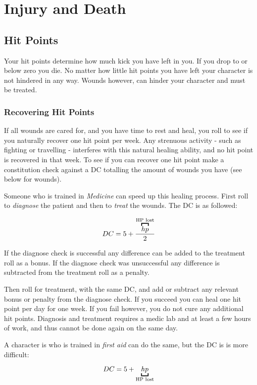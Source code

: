 \chapter{Injury and Death}

\section{Hit Points}
\label{sec:hp}

Your hit points determine how much kick you have left in you. If you drop to or
below zero you die. No matter how little hit points you have left your character
is not hindered in any way. Wounds however, can hinder your character and must
be treated.

\subsection{Recovering Hit Points}
\label{sub:recoverhp}

If all wounds are cared for, and you have time to rest and heal, you roll to
see if you naturally recover one hit point per week. Any strenuous activity -
such as fighting or travelling - interferes with this natural healing ability,
and no hit point is recovered in that week. To see if you can recover one hit
point make a constitution check against a DC totalling the amount of wounds you
have (see below for wounds).

Someone who is trained in \emph{Medicine} can speed up this healing process.
First roll to \emph{diagnose} the patient and then to \emph{treat} the wounds.
The DC is as followed:

\[
DC = 5 + \frac{\ob{hp}{HP lost}}{2}
\]

If the diagnose check is successful any difference can be added to the treatment
roll as a bonus. If the diagnose check was unsuccessful any difference is
subtracted from the treatment roll as a penalty.

Then roll for treatment, with the same DC, and add or subtract any relevant
bonus or penalty from the diagnose check. If you succeed you can heal one hit
point per day for one week. If you fail however, you do not cure any additional
hit points. Diagnosis and treatment requires a medic lab and at least a few
hours of work, and thus cannot be done again on the same day.

A character is who is trained in \emph{first aid} can do the same, but the DC is
is more difficult:

\[
DC = 5 + \ub{hp}{HP lost}
\]

